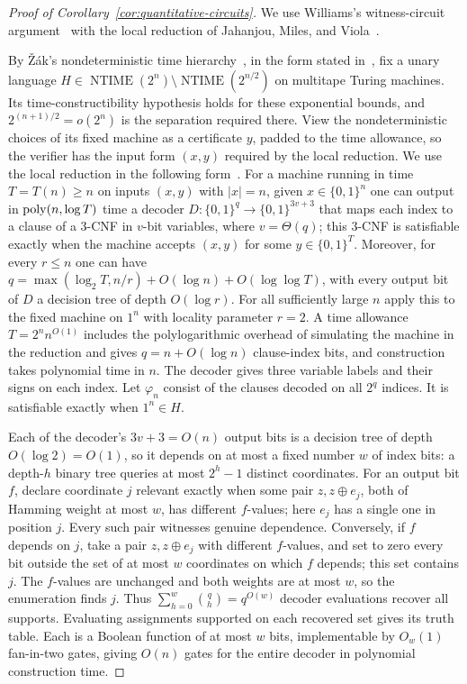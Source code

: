 \begin{proof}[Proof of Corollary~\ref{cor:quantitative-circuits}]
We use Williams's witness-circuit argument~\cite[Theorem~6.1]{Wil13}
with the local reduction of Jahanjou, Miles, and
Viola~\cite[Theorem~1 and Section~6]{JMV13}.

By \v{Z}\'ak's nondeterministic time hierarchy~\cite{Zak83}, in the
form stated in~\cite[Theorem~2.1 in the full version]{Wil13}, fix a unary language
$H\in\operatorname{NTIME}(2^n)\setminus\operatorname{NTIME}(2^{n/2})$
on multitape Turing machines. Its time-constructibility hypothesis
holds for these exponential bounds, and
$2^{(n+1)/2}=o(2^n)$ is the separation required there.
View the nondeterministic choices of its fixed machine as a
certificate $y$, padded to the time allowance, so the verifier has
the input form $(x,y)$ required by the local reduction.
We use the local reduction in the following form~\cite[Theorem~1]{JMV13}.
For a machine running in time $T=T(n)\ge n$ on inputs $(x,y)$ with
$|x|=n$, given $x\in\{0,1\}^n$ one can output in $\operatorname{poly}(n,\log T)$
time a decoder $D:\{0,1\}^q\to\{0,1\}^{3v+3}$ that maps each index to
a clause of a $3$-CNF in $v$-bit variables, where $v=\Theta(q)$; this
$3$-CNF is satisfiable exactly when the machine accepts $(x,y)$ for
some $y\in\{0,1\}^T$. Moreover, for every $r\le n$ one can have
$q=\max(\log_2 T,n/r)+O(\log n)+O(\log\log T)$, with every output bit
of $D$ a decision tree of depth $O(\log r)$.
For all sufficiently large $n$ apply this to the fixed machine on $1^n$
with locality parameter $r=2$. A time allowance
$T=2^n n^{O(1)}$ includes the polylogarithmic overhead of simulating
the machine in the reduction and gives $q=n+O(\log n)$ clause-index
bits, and construction takes polynomial time in $n$.
The decoder gives three variable labels and their signs on each index. Let $\varphi_n$
consist of the clauses decoded on all $2^q$ indices. It is satisfiable
exactly when $1^n\in H$.

Each of the decoder's $3v+3=O(n)$ output bits is a decision tree of
depth $O(\log 2)=O(1)$, so it depends on at most a fixed number $w$ of index bits:
a depth-$h$ binary tree queries at most $2^h-1$ distinct coordinates.
For an output bit $f$, declare coordinate $j$ relevant exactly when
some pair $z,z\oplus e_j$, both of Hamming weight at most $w$,
has different $f$-values; here $e_j$ has a single one in position $j$.
Every such pair witnesses genuine dependence. Conversely, if $f$
depends on $j$, take a pair $z,z\oplus e_j$ with different $f$-values,
and set to zero every bit outside the set of at most $w$ coordinates
on which $f$ depends; this set contains $j$. The $f$-values are
unchanged and both weights are at most $w$, so the enumeration finds $j$. Thus
$\sum_{h=0}^w\binom qh=q^{O(w)}$ decoder evaluations recover all
supports. Evaluating assignments supported on each recovered set
gives its truth table. Each is a Boolean function of at most $w$
bits, implementable by $O_w(1)$ fan-in-two gates, giving $O(n)$
gates for the entire decoder in polynomial construction time.


\end{proof}
